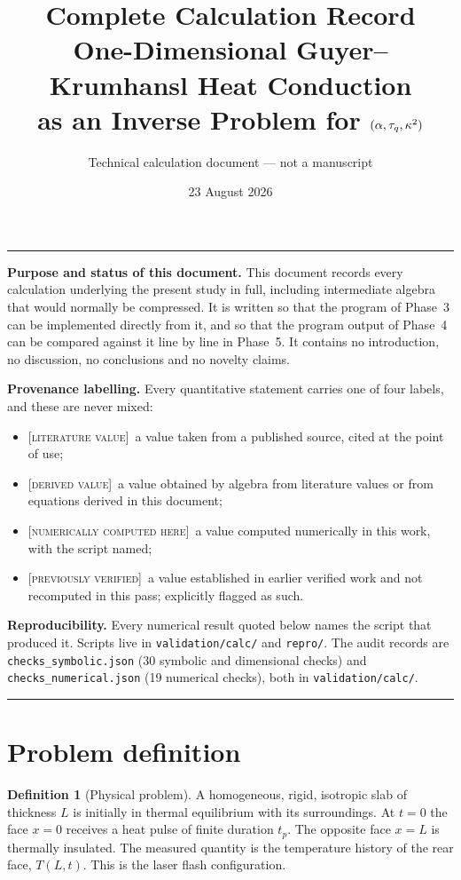 \documentclass[11pt,a4paper]{article}
\title{\textbf{Complete Calculation Record}\\[0.4ex]
       \large One-Dimensional Guyer--Krumhansl Heat Conduction\\
       as an Inverse Problem for $(\alpha,\tau_{q},\kappa^{2})$}
\author{Technical calculation document --- not a manuscript}
\date{23 August 2026}
\theoremstyle{definition}
\newtheorem{definitionx}{Definition}[section]
\newcommand{\LIT}{\textcolor{blue!55!black}{\footnotesize[\textsc{literature value}]}}
\newcommand{\DER}{\textcolor{green!35!black}{\footnotesize[\textsc{derived value}]}}
\newcommand{\NUM}{\textcolor{red!55!black}{\footnotesize[\textsc{numerically computed here}]}}
\newcommand{\PREV}{\textcolor{orange!70!black}{\footnotesize[\textsc{previously verified}]}}
\begin{document}
\maketitle

\noindent
\rule{\linewidth}{1pt}

\textbf{Purpose and status of this document.}
This document records every calculation underlying the present study in full,
including intermediate algebra that would normally be compressed. It is written
so that the program of Phase~3 can be implemented directly from it, and so that
the program output of Phase~4 can be compared against it line by line in
Phase~5. It contains no introduction, no discussion, no conclusions and no
novelty claims.

\textbf{Provenance labelling.} Every quantitative statement carries one of four
labels, and these are never mixed:
\begin{itemize}[nosep]
  \item \LIT\ a value taken from a published source, cited at the point of use;
  \item \DER\ a value obtained by algebra from literature values or from
        equations derived in this document;
  \item \NUM\ a value computed numerically in this work, with the script named;
  \item \PREV\ a value established in earlier verified work and not recomputed
        in this pass; explicitly flagged as such.
\end{itemize}

\textbf{Reproducibility.} Every numerical result quoted below names the script
that produced it. Scripts live in \texttt{validation/calc/} and
\texttt{repro/}. The audit records are
\texttt{checks\_symbolic.json} (30 symbolic and dimensional checks) and
\texttt{checks\_numerical.json} (19 numerical checks), both in
\texttt{validation/calc/}.

\noindent
\rule{\linewidth}{1pt}

\tableofcontents
\clearpage

\section{Problem definition}
\label{sec:problem}

\begin{definitionx}[Physical problem]
\label{def:problem}
A homogeneous, rigid, isotropic slab of thickness $L$ is initially in thermal
equilibrium with its surroundings. At $t=0$ the face $x=0$ receives a heat
pulse of finite duration $t_{p}$. The opposite face $x=L$ is thermally
insulated. The measured quantity is the temperature history of the rear face,
$T(L,t)$. This is the laser flash configuration.
\end{definitionx}
\end{document}
